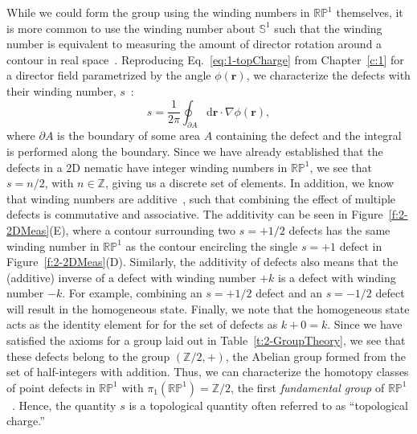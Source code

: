 While we could form the group using the winding numbers in $\mathbb{R}\mathbb{P}^1$ themselves, it is more common to use the winding number about $\mathbb{S}^1$ such that the winding number is equivalent to measuring the amount of director rotation around a contour in real space~\cite{RN23,RN153,RN203}.
Reproducing Eq.~\ref{eq:1-topCharge} from Chapter~\ref{c:1} for a director field parametrized by the angle $\phi(\mathbf{r})$, we characterize the defects with their winding number, $s$~\cite{RN153,RN236}:
\begin{equation}
  s = \frac{1}{2 \pi}\oint_{\partial A} \textrm{d}\mathbf{r} \cdot \nabla\phi(\mathbf{r}),\label{eq:2-topCharge}
\end{equation}
where $\partial A$ is the boundary of some area $A$ containing the defect and the integral is performed along the boundary.
Since we have already established that the defects in a 2D nematic have integer winding numbers in $\mathbb{R}\mathbb{P}^1$, we see that $s = n/2$, with $n \in \mathbb{Z}$, giving us a discrete set of elements.
In addition, we know that winding numbers are additive~\cite{RN196}, such that combining the effect of multiple defects is commutative and associative.
The additivity can be seen in Figure~\ref{f:2-2DMeas}(E), where a contour surrounding two $s = +1/2$ defects has the same winding number in $\mathbb{R}\mathbb{P}^1$ as the contour encircling the single $s = +1$ defect in Figure~\ref{f:2-2DMeas}(D).
Similarly, the additivity of defects also means that the (additive) inverse of a defect with winding number $+k$ is a defect with winding number $-k$.
For example, combining an $s = +1/2$ defect and an $s = -1/2$ defect will result in the homogeneous state.
Finally, we note that the homogeneous state acts as the identity element for for the set of defects as $k + 0 = k$.
Since we have satisfied the axioms for a group laid out in Table~\ref{t:2-GroupTheory}, we see that these defects belong to the group $(\mathbb{Z}/2, +)$, the Abelian group formed from the set of half-integers with addition.
Thus, we can characterize the homotopy classes of point defects in $\mathbb{R}\mathbb{P}^1$ with $\pi_1 (\mathbb{R}\mathbb{P}^1) = \mathbb{Z}/2$, the first \emph{fundamental group} of $\mathbb{R}\mathbb{P}^1$~\cite{RN196,RN153,RN236}.
Hence, the quantity $s$ is a topological quantity often referred to as ``topological charge.''
